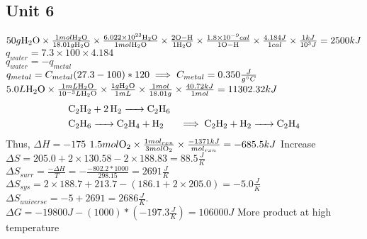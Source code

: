 \documentclass[../main.tex]{subfiles}
\begin{document}
\subsection{Unit 6}
\AnswerSet
\(50g\ce{H2O}\times \frac{1mol\ce{H2O}}{18.01g\ce{H2O}} \times \frac{6.022\times 10^{23}\ce{H2O}}{1mol\ce{H2O}} \times \frac{2\ce{O-H}}{1\ce{H2O}} 
\times \frac{1.8 \times 10^{-9}cal}{1\ce{O-H}} \times \frac{4.184J}{1cal}\times\frac{1kJ}{10^3J} = 2500kJ\)
\AnswerSet
\(q_{water} = 7.3 \times 100 \times 4.184\) \\
\(q_{water} = -q_{metal}\)\\
\(q_{metal} = C_{metal} (27.3-100)*120 \implies C_{metal} = 0.350 \frac{J}{g\degree C}\)
\AnswerSet
\(5.0L\ce{H2O} \times\frac{1mL\ce{H2O}}{10^{-3}L\ce{H2O}}\times\frac{1g\ce{H2O}}{1mL}\times\frac{1mol}{18.01g}\times\frac{40.72kJ}{1mol} = 11302.32kJ\) 
\AnswerSet
\begin{equation*}
\begin{aligned}
& \ce{C2H2 + 2H2 -> C2H6} \\
& \ce{C2H6 -> C2H4 + H2} 
& \implies \ce{C2H2 + H2 -> C2H4}
\end{aligned}
\end{equation*}
Thus, \(\Delta H = -175\)
\AnswerSet
\(1.5mol\ce{O2} \times \frac{1mol_{rxn}}{3mol\ce{O2}} \times \frac{-1371kJ}{mol_{rxn}} = -685.5kJ  \) 
\AnswerSet
Increase
\AnswerSet
\(\Delta S = 205.0 + 2\times 130.58 - 2 \times 188.83 = 88.5 \frac{J}{K}\)
\AnswerSet
\(\Delta S_{surr} = \frac{-\Delta H}{T} = -\frac{-802.2*1000}{298.15} = 2691 \frac{J}{K}\) \\
\(\Delta S_{sys} = 2\times 188.7 + 213.7 - (186.1 + 2\times 205.0) = -5.0 \frac{J}{K}\) \\
\(\Delta S_{universe} = -5 + 2691 = 2686\frac{J}{K}\). 
\AnswerSet
\(\Delta G = -19800J - (1000)*(-197.3\frac{J}{K}) = 106000J\) 
\AnswerSet
More product at high temperature 
\end{document}

